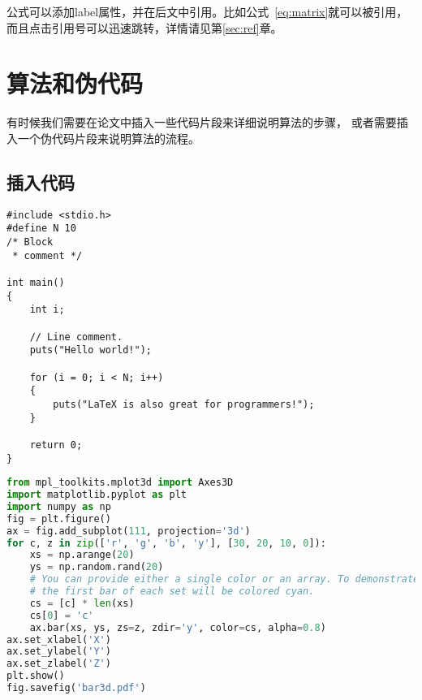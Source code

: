 \documentclass[UTF8, fontset=windows]{ctexart}
\numberwithin{equation}{section} %
\numberwithin{table}{section} %
\begin{document}
公式可以添加label属性，并在后文中引用。比如公式~\ref{eq:matrix}就可以被引用，
而且点击引用号可以迅速跳转，详情请见第\ref{sec:ref}章。

\section{算法和伪代码}
有时候我们需要在论文中插入一些代码片段来详细说明算法的步骤，
或者需要插入一个伪代码片段来说明算法的流程。

\subsection{插入代码}
\lstset{escapechar=@,style=customc}

\begin{lstlisting}[caption={一段C语言程序。},captionpos=b]
#include <stdio.h>
#define N 10
/* Block
 * comment */

int main()
{
    int i;

    // Line comment.
    puts("Hello world!");
    
    for (i = 0; i < N; i++)
    {
        puts("LaTeX is also great for programmers!");
    }

    return 0;
}
\end{lstlisting}

\begin{lstlisting}[caption={一段Python语言程序。},captionpos=b,language=Python]
from mpl_toolkits.mplot3d import Axes3D
import matplotlib.pyplot as plt
import numpy as np
fig = plt.figure()
ax = fig.add_subplot(111, projection='3d')
for c, z in zip(['r', 'g', 'b', 'y'], [30, 20, 10, 0]):
    xs = np.arange(20)
    ys = np.random.rand(20)
    # You can provide either a single color or an array. To demonstrate this,
    # the first bar of each set will be colored cyan.
    cs = [c] * len(xs)
    cs[0] = 'c'
    ax.bar(xs, ys, zs=z, zdir='y', color=cs, alpha=0.8)
ax.set_xlabel('X')
ax.set_ylabel('Y')
ax.set_zlabel('Z')
plt.show()
fig.savefig('bar3d.pdf')
\end{lstlisting}
\end{document}
